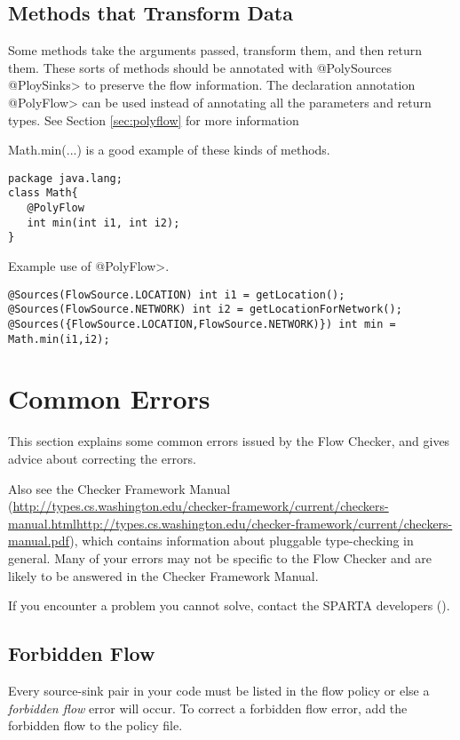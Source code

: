 \subsection{Methods that Transform Data}

Some methods take the arguments passed, transform them, and then return them.  These sorts of 
methods should be annotated with \<@PolySources @PloySinks>
  to preserve the flow information.  The declaration annotation \<@PolyFlow> can be used instead of
  annotating all the parameters and return types. See Section \ref{sec:polyflow} for more information 
  
  Math.min(...) is a good example of these kinds of methods. 
  
  \begin{Verbatim}
package java.lang;
class Math{
   @PolyFlow  
   int min(int i1, int i2);
}
\end{Verbatim}

Example use of \<@PolyFlow>.
\begin{Verbatim}
@Sources(FlowSource.LOCATION) int i1 = getLocation();
@Sources(FlowSource.NETWORK) int i2 = getLocationForNetwork();
@Sources({FlowSource.LOCATION,FlowSource.NETWORK)}) int min = Math.min(i1,i2);
 \end{Verbatim}

\section{Common Errors\label{errors}}

This section explains some common errors issued by the Flow Checker, and
gives advice about correcting the errors.   

Also see the Checker Framework Manual
(\ifhevea\url{http://types.cs.washington.edu/checker-framework/current/checkers-manual.html}\else\url{http://types.cs.washington.edu/checker-framework/current/checkers-manual.pdf}\fi),
which contains information about pluggable type-checking in general.  Many
of your errors may not be specific to the Flow Checker and are likely to be
answered in the Checker Framework Manual.

If you encounter a problem you cannot solve, contact the SPARTA developers ().



\subsection{Forbidden Flow}  
Every source-sink pair in your code must be listed in the flow policy or else a \emph{forbidden flow} error will occur.
To correct a forbidden flow error, add the forbidden flow to the policy file. 
  
